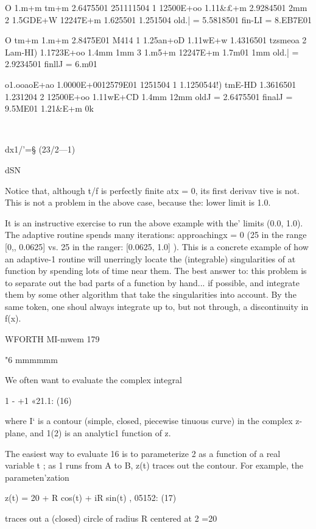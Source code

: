 {{{{{{{{O 1.m+m tm+m 2.6475501 251111504
1 12500E+oo 1.11&£+m 2.9284501 2mm
2 1.5GDE+W 12247E+m 1.625501 1.251504
old.| = 5.5818501 fin-LI = 8.EB7E01

O tm+m 1.m+m 2.8475E01 M414
1 1.25an+oD 1.11wE+w 1.4316501 tzsmeoa
2 Lam-HI) 1.1723E+oo 1.4mm 1mm
3 1.m5+m 12247E+m 1.7m01 1mm
old.| = 2.9234501 ﬁnllJ = 6.m01

o1.ooaoE+ao 1.0000E+0012579E01 1251504
1 1.1250544!) tmE-HD 1.3616501 1.231204
2 12500E+oo 1.11wE+CD 1.4mm 12mm
oldJ = 2.6475501 ﬁnalJ = 9.5ME01
1.21&E+m 0k

\

 

dx1/'=§ (23/2—1)

dSN

 

 

 

 

Notice that, although t/f is perfectly ﬁnite atx = 0, its ﬁrst derivav
tive is not. This is not a problem in the above case, because the:
lower limit is 1.0.

It is an instructive exercise to run the above example with the'
limits (0.0, 1.0). The adaptive routine spends many iterations:
approachingx = 0 (25 in the range [0,, 0.0625] vs. 25 in the ranger:
[0.0625, 1.0] ). This is a concrete example of how an adaptive-1
routine will unerringly locate the (integrable) singularities of at
function by spending lots of time near them. The best answer to:
this problem is to separate out the bad parts of a function by hand...
if possible, and integrate them by some other algorithm that take
the singularities into account. By the same token, one shoul
always integrate up to, but not through, a discontinuity in f(x).

WFORTH MI-mwem 179

"6 mmmmmm

We often want to evaluate the complex integral

1 - +1 «21.1: (16)

where I‘ is a contour (simple, closed, piecewise tinuous curve)
in the complex z-plane, and 1(2) is an analytic1 function of z.

The easiest way to evaluate 16 is to parameterize 2 as a function
of a real variable t ; as 1 runs from A to B, z(t) traces out the
contour. For example, the parameten'zation

z(t) = 20 + R cos(t) + iR sin(t) , 05152: (17)

traces out a (closed) circle of radius R centered at 2 =20

}}}}}}}}
